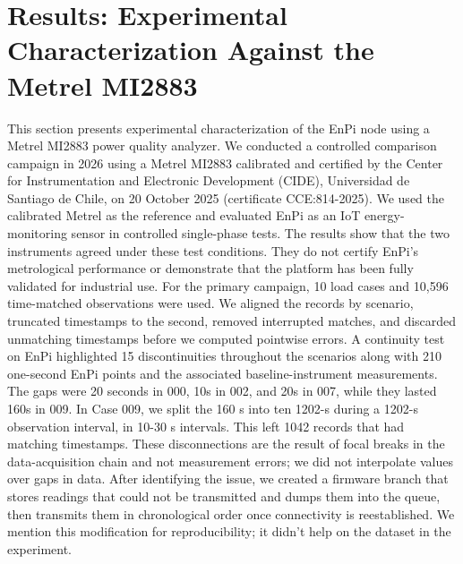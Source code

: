 \documentclass[technologies,article,submit,pdftex,moreauthors]{Definitions/mdpi}
\begin{document}
\section{Results: Experimental Characterization Against the Metrel MI2883}
\label{sec:metrel-validation}
This section presents experimental characterization of the EnPi node using a Metrel MI2883 power quality analyzer. We conducted a controlled comparison campaign in 2026 using a Metrel MI2883 calibrated and certified by the Center for Instrumentation and Electronic Development (CIDE), Universidad de Santiago de Chile, on 20 October 2025 (certificate CCE:814-2025). We used the calibrated Metrel as the reference and evaluated EnPi as an IoT energy-monitoring sensor in controlled single-phase tests. The results show that the two instruments agreed under these test conditions. They do not certify EnPi’s metrological performance or demonstrate that the platform has been fully validated for industrial use.
For the primary campaign, 10 load cases and 10,596 time-matched observations were used. We aligned the records by scenario, truncated timestamps to the second, removed interrupted matches, and discarded unmatching timestamps before we computed pointwise errors. A continuity test on EnPi highlighted 15 discontinuities throughout the scenarios along with 210 one-second EnPi points and the associated baseline-instrument measurements. The gaps were 20 seconds in 000, 10s in 002, and 20s in 007, while they lasted 160s in 009. In Case 009, we split the 160 s into ten 1202-s during a 1202-s observation interval, in 10-30 s intervals. This left 1042 records that had matching timestamps.
These disconnections are the result of focal breaks in the data-acquisition chain and not measurement errors; we did not interpolate values over gaps in data. After identifying the issue, we created a firmware branch that stores readings that could not be transmitted and dumps them into the queue, then transmits them in chronological order once connectivity is reestablished. We mention this modification for reproducibility; it didn't help on the dataset in the experiment.  
\end{document}
